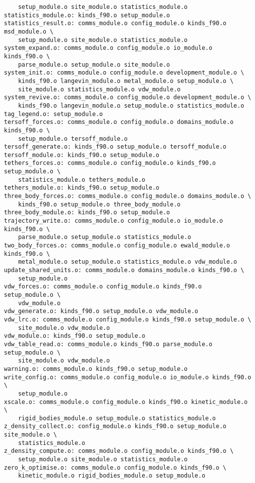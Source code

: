 \begin{verbatim}
	setup_module.o site_module.o statistics_module.o
statistics_module.o: kinds_f90.o setup_module.o
statistics_result.o: comms_module.o config_module.o kinds_f90.o msd_module.o \
	setup_module.o site_module.o statistics_module.o
system_expand.o: comms_module.o config_module.o io_module.o kinds_f90.o \
	parse_module.o setup_module.o site_module.o
system_init.o: comms_module.o config_module.o development_module.o \
	kinds_f90.o langevin_module.o metal_module.o setup_module.o \
	site_module.o statistics_module.o vdw_module.o
system_revive.o: comms_module.o config_module.o development_module.o \
	kinds_f90.o langevin_module.o setup_module.o statistics_module.o
tag_legend.o: setup_module.o
tersoff_forces.o: comms_module.o config_module.o domains_module.o kinds_f90.o \
	setup_module.o tersoff_module.o
tersoff_generate.o: kinds_f90.o setup_module.o tersoff_module.o
tersoff_module.o: kinds_f90.o setup_module.o
tethers_forces.o: comms_module.o config_module.o kinds_f90.o setup_module.o \
	statistics_module.o tethers_module.o
tethers_module.o: kinds_f90.o setup_module.o
three_body_forces.o: comms_module.o config_module.o domains_module.o \
	kinds_f90.o setup_module.o three_body_module.o
three_body_module.o: kinds_f90.o setup_module.o
trajectory_write.o: comms_module.o config_module.o io_module.o kinds_f90.o \
	parse_module.o setup_module.o statistics_module.o
two_body_forces.o: comms_module.o config_module.o ewald_module.o kinds_f90.o \
	metal_module.o setup_module.o statistics_module.o vdw_module.o
update_shared_units.o: comms_module.o domains_module.o kinds_f90.o \
	setup_module.o
vdw_forces.o: comms_module.o config_module.o kinds_f90.o setup_module.o \
	vdw_module.o
vdw_generate.o: kinds_f90.o setup_module.o vdw_module.o
vdw_lrc.o: comms_module.o config_module.o kinds_f90.o setup_module.o \
	site_module.o vdw_module.o
vdw_module.o: kinds_f90.o setup_module.o
vdw_table_read.o: comms_module.o kinds_f90.o parse_module.o setup_module.o \
	site_module.o vdw_module.o
warning.o: comms_module.o kinds_f90.o setup_module.o
write_config.o: comms_module.o config_module.o io_module.o kinds_f90.o \
	setup_module.o
xscale.o: comms_module.o config_module.o kinds_f90.o kinetic_module.o \
	rigid_bodies_module.o setup_module.o statistics_module.o
z_density_collect.o: config_module.o kinds_f90.o setup_module.o site_module.o \
	statistics_module.o
z_density_compute.o: comms_module.o config_module.o kinds_f90.o \
	setup_module.o site_module.o statistics_module.o
zero_k_optimise.o: comms_module.o config_module.o kinds_f90.o \
	kinetic_module.o rigid_bodies_module.o setup_module.o
\end{verbatim}
